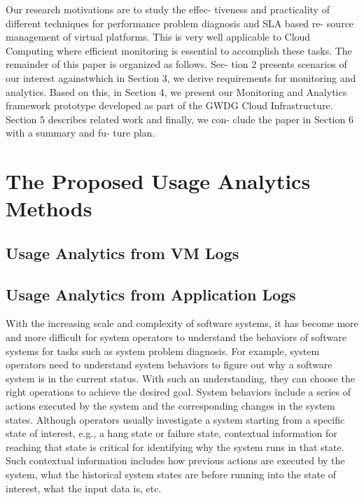 Our research motivations are to study the effec-
tiveness and practicality of different techniques for performance problem diagnosis and SLA based re- source management of virtual platforms. This is very well applicable to Cloud Computing where efficient monitoring is essential to accomplish these tasks. The remainder of this paper is organized as follows. Sec- tion 2 presents scenarios of our interest againstwhich in Section 3, we derive requirements for monitoring and analytics. Based on this, in Section 4, we present our Monitoring and Analytics framework prototype developed as part of the GWDG Cloud Infrastructure. Section 5 describes related work and finally, we con- clude the paper in Section 6 with a summary and fu- ture plan.



\section{The Proposed Usage Analytics Methods}

\subsection{Usage Analytics from VM Logs}


\subsection{Usage Analytics from Application Logs}
With the increasing scale and complexity of software
systems, it has become more and more difficult for system operators to understand the behaviors of software systems for tasks such as system problem diagnosis. For example, system operators need to understand system behaviors to figure out why a software system is in the current status. With such an understanding, they can choose the right operations to achieve the desired goal. System behaviors include a series of actions executed by the system and the corresponding changes in the system states. Although operators usually investigate a system starting from a specific state of interest, e.g., a hang state or failure state, contextual information for reaching that state is critical for identifying why the system runs in that state. Such contextual information includes how previous actions are executed by the system, what the historical system states are before running into the state of interest, what the input data is, etc.





